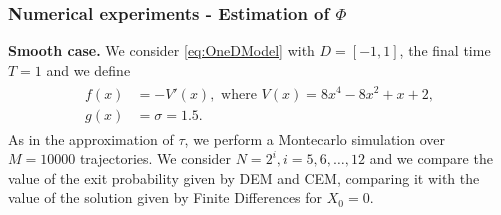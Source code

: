 \subsubsection{Numerical experiments - Estimation of $\Phi$}

\textbf{Smooth case.} We consider \eqref{eq:OneDModel} with $D = \left[ -1, 1 \right]$, the final time $T = 1$ and we define
\begin{align}\label{eq:FunctionsOneDSmoothPhi}
\begin{split}
	f(x) &= -V'(x), \text{ where } V(x) = 8x^4 - 8x^2 + x + 2, \\
	g(x) &= \sigma = 1.5.
\end{split}
\end{align}
As in the approximation of $\tau$, we perform a Montecarlo simulation over $M = 10000$ trajectories. We consider $N = 2^i, i = 5,6,\dots,12$ and we compare the value of the exit probability given by DEM and CEM, comparing it with the value of the solution given by Finite Differences for $X_0 = 0$. 
